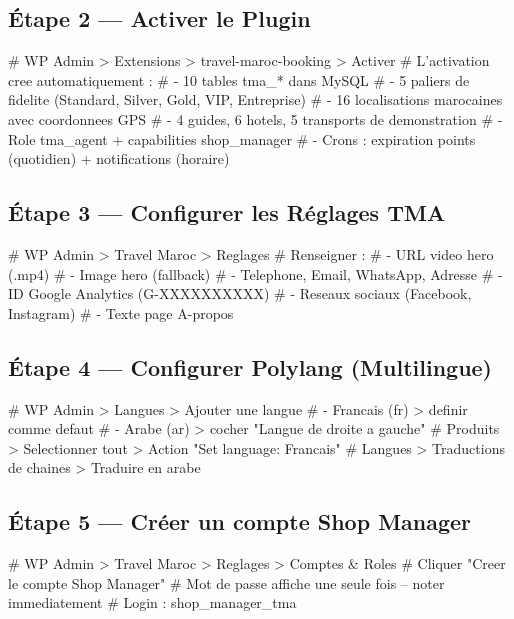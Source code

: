 \documentclass[12pt,a4paper]{report}
\begin{document}
\subsection{\'Etape 2 --- Activer le Plugin}

\begin{shellbox}
# WP Admin > Extensions > travel-maroc-booking > Activer
# L'activation cree automatiquement :
#   - 10 tables tma_* dans MySQL
#   - 5 paliers de fidelite (Standard, Silver, Gold, VIP, Entreprise)
#   - 16 localisations marocaines avec coordonnees GPS
#   - 4 guides, 6 hotels, 5 transports de demonstration
#   - Role tma_agent + capabilities shop_manager
#   - Crons : expiration points (quotidien) + notifications (horaire)
\end{shellbox}

\subsection{\'Etape 3 --- Configurer les R\'eglages TMA}

\begin{shellbox}
# WP Admin > Travel Maroc > Reglages
# Renseigner :
#   - URL video hero (.mp4)
#   - Image hero (fallback)
#   - Telephone, Email, WhatsApp, Adresse
#   - ID Google Analytics (G-XXXXXXXXXX)
#   - Reseaux sociaux (Facebook, Instagram)
#   - Texte page A-propos
\end{shellbox}

\subsection{\'Etape 4 --- Configurer Polylang (Multilingue)}

\begin{shellbox}
# WP Admin > Langues > Ajouter une langue
#   - Francais (fr) > definir comme defaut
#   - Arabe (ar) > cocher "Langue de droite a gauche"
# Produits > Selectionner tout > Action "Set language: Francais"
# Langues > Traductions de chaines > Traduire en arabe
\end{shellbox}

\subsection{\'Etape 5 --- Cr\'eer un compte Shop Manager}

\begin{shellbox}
# WP Admin > Travel Maroc > Reglages > Comptes & Roles
# Cliquer "Creer le compte Shop Manager"
# Mot de passe affiche une seule fois -- noter immediatement
# Login : shop_manager_tma
\end{shellbox}
\end{document}
